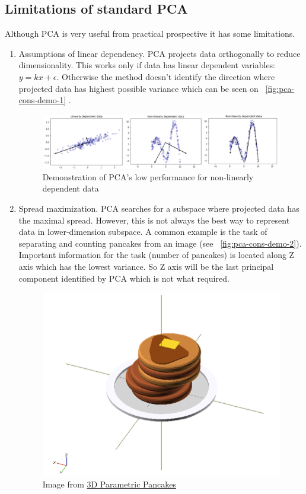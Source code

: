 \subsection{Limitations of standard PCA}\label{limitations}
Although PCA is very useful from practical prospective it has some limitations.
\begin{enumerate}
	\item Assumptions of linear dependency.
	PCA projects data orthogonally to reduce dimensionality. This works only if data has linear dependent variables:  $y = k x + \epsilon$. Otherwise the method doesn't identify the direction where  projected data has highest possible variance which can be seen on   ~\autoref{fig:pca-cons-demo-1} . 
	
	\begin{figure}[h]
		\centering
		\includegraphics[scale=0.4]{img/pca-linear-separation-demo.png}
		\caption{\label{fig:pca-cons-demo-1}Demonstration of PCA's low performance for non-linearly dependent data}
	\end{figure}
	
	\item Spread maximization. 
	PCA searches for a subspace where projected data has the maximal spread. However, this is not always the best way to represent data in lower-dimension subspace. A common example is the task of separating and counting pancakes from an image (see ~\autoref{fig:pca-cons-demo-2}). Important information for the task (number of pancakes) is located along Z axis which has the lowest variance. So Z axis will be the last principal component identified by PCA which is not what required. 
	
	\begin{figure}[h]
		\centering
		\includegraphics[width=.5\textwidth, scale=0.4]{img/pancakes-white.png}
		\caption{\label{fig:pca-cons-demo-2}Image from  \href{http://golancourses.net/2014/kevan/01/23/3d-parametric-pancakes/}{3D Parametric Pancakes}
		}
	\end{figure}
	

\end{enumerate}
